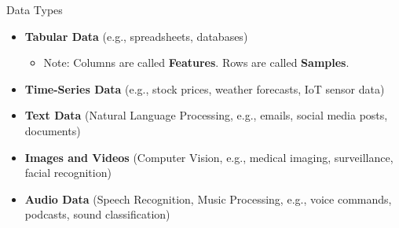 \begin{frame}{Data Types}
    \begin{itemize}
        \item \textbf{Tabular Data} (e.g., spreadsheets, databases)
        \begin{itemize}
            \item Note: Columns are called \textbf{Features}. Rows are called \textbf{Samples}.
        \end{itemize}
        
        \item \textbf{Time-Series Data} (e.g., stock prices, weather forecasts, IoT sensor data)
        
        \item \textbf{Text Data} (Natural Language Processing, e.g., emails, social media posts, documents)
        
        \item \textbf{Images and Videos} (Computer Vision, e.g., medical imaging, surveillance, facial recognition)
        
        \item \textbf{Audio Data} (Speech Recognition, Music Processing, e.g., voice commands, podcasts, sound classification)
    \end{itemize}
\end{frame}


